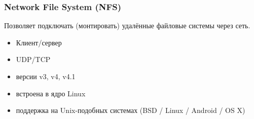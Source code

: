 \begin{frame}
    \frametitle{Network File System (NFS)}
    Позволяет подключать (монтировать) удалённые файловые системы через сеть.
\begin{itemize}
    \item Клиент/сервер
    \item UDP/TCP
    \item версии v3, v4, v4.1 
    \item встроена в ядро Linux
    \item поддержка на Unix-подобных системах (BSD / Linux / Android / OS X)
\end{itemize}
    

\end{frame}